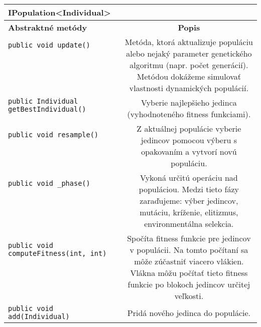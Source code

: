 \begin{table}
\centering
\begin{tabular}{|l|c|}
\hline
\textbf{IPopulation<Individual>} & \\
\hline\hline
\textbf{Abstraktné metódy} & \textbf{Popis} \\
\hline
\verb|public void update()| & \multirow{8}{5cm}{Metóda, ktorá aktualizuje populáciu alebo nejaký parameter genetického algoritmu (napr. počet generácií). Metódou dokážeme simulovať vlastnosti dynamických populácií.}\\
& \\
& \\
& \\
& \\
& \\
& \\
& \\
\hline
\verb|public Individual getBestIndividual()| & \multirow{3}{5cm}{Vyberie najlepšieho jedinca (vyhodnoteného fitness funkciami).}\\
& \\
& \\
\hline
\verb|public void resample()| & \multirow{4}{5cm}{Z aktuálnej populácie vyberie jedincov pomocou výberu s opakovaním a vytvorí novú populáciu.} \\
& \\
& \\
& \\
\hline
\verb|public void _phase()| &	
\multirow{6}{5cm}{Vykoná určitú operáciu nad populáciou. Medzi tieto fázy zaraďujeme: výber jedincov, mutáciu, kríženie, elitizmus, environmentálna selekcia.} \\
& \\
& \\
& \\
& \\
& \\
\hline
\verb|public void computeFitness(int, int)| & \multirow{7}{5cm}{Spočíta fitness funkcie pre jedincov v populácii. Na tomto počítaní sa môže zúčastniť viacero vlákien. Vlákna môžu počítať tieto fitness funkcie po blokoch jedincov určitej veľkosti.} \\
& \\
& \\
& \\
& \\
& \\
& \\
\hline
\verb|public void add(Individual)| & \multirow{2}{5cm}{Pridá nového jedinca do populácie.} \\

\end{tabular}
\end{table}
